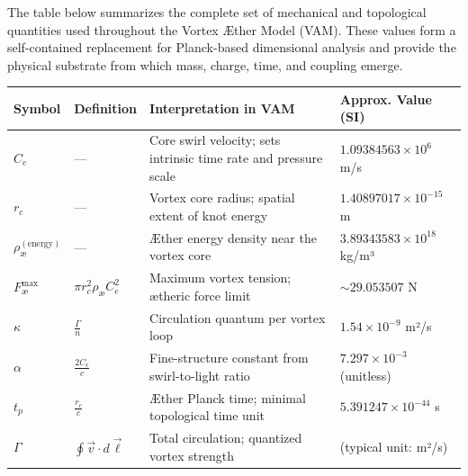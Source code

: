 \documentclass[12pt]{article}
\begin{document}
The table below summarizes the complete set of mechanical and topological quantities used throughout the Vortex Æther Model (VAM). These values form a self-contained replacement for Planck-based dimensional analysis and provide the physical substrate from which mass, charge, time, and coupling emerge.

\begin{table}[H]
    \centering
    \scriptsize
    \renewcommand{\arraystretch}{1.3}
    \begin{tabular}{|l|l|l|l|}
        \hline
        \textbf{Symbol} & \textbf{Definition} & \textbf{Interpretation in VAM} & \textbf{Approx. Value (SI)} \\
        \hline

        $C_e$ &
        — &
        Core swirl velocity; sets intrinsic time rate and pressure scale &
        $1.09384563 \times 10^6$ m/s \\
        \hline

        $r_c$ &
        — &
        Vortex core radius; spatial extent of knot energy &
        $1.40897017 \times 10^{-15}$ m \\
        \hline

        $\rho_\text{\ae}^{(\text{energy})}$ &
        — &
        Æther energy density near the vortex core &
        $3.89343583 \times 10^{18}$ kg/m³ \\
        \hline

        $F^{\text{max}}_{\text{\ae}}$ &
        $\pi r_c^2 \rho_\text{\ae} C_e^2$ &
        Maximum vortex tension; ætheric force limit &
        $\sim 29.053507$ N \\
        \hline

        $\kappa$ &
        $\frac{\Gamma}{n}$ &
        Circulation quantum per vortex loop &
        $1.54 \times 10^{-9}$ m²/s \\
        \hline

        $\alpha$ &
        $\frac{2 C_e}{c}$ &
        Fine-structure constant from swirl-to-light ratio &
        $7.297 \times 10^{-3}$ (unitless) \\
        \hline

        $t_p$ &
        $\frac{r_c}{c}$ &
        Æther Planck time; minimal topological time unit &
        $5.391247 \times 10^{-44}$ s \\
        \hline

        $\Gamma$ &
        $\oint \vec{v} \cdot d\vec{\ell}$ &
        Total circulation; quantized vortex strength &
        (typical unit: m²/s) \\
        \hline


\end{tabular}
\end{table}
\end{document}
